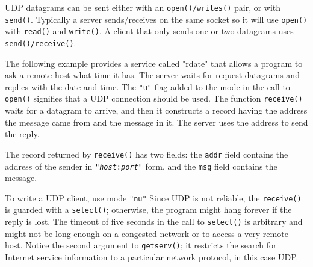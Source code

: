 UDP datagrams can be sent either with an \texttt{open()/writes()}
pair, or with \texttt{send()}. Typically a server sends/receives on the
same socket so it will use \texttt{open()} with \texttt{read()} and
\texttt{write()}. A client that only sends one or two datagrams uses
\texttt{send()}\texttt{/}\texttt{receive()}.

The following example provides a service called
"rdate" that allows a program to ask a
remote host what time it has. The server waits for request datagrams
and replies with the date and time. The
\texttt{"u"} flag added to the mode in the
call to \texttt{open()} signifies that a UDP connection should be used.
The function \texttt{receive()} waits for a datagram to arrive, and
then it constructs a record having the address the message came from
and the message in it. The server uses the address to send the reply.


The record returned by \texttt{receive()} has two fields: the
\texttt{addr} field contains the address of the sender in
\texttt{"}\texttt{\textit{host}}\texttt{:}\texttt{\textit{port}}\texttt{"}
form, and the \texttt{msg} field contains the message.

To write a UDP client, use mode \texttt{"nu"}
Since UDP is not reliable, the \texttt{receive()} is guarded
with a \texttt{select()}; otherwise, the program might hang forever if
the reply is lost. The timeout of five seconds in the call to
\texttt{select()} is arbitrary and might not be long enough on a
congested network or to access a very remote host. Notice the second
argument to \texttt{getserv()}; it restricts the search for Internet
service information to a particular network protocol, in this case UDP.


